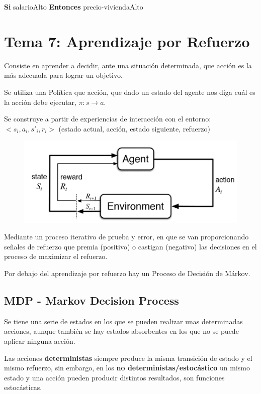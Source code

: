 \documentclass[12pt, twoside, openright]{report} %
\begin{document}
\textbf{Si} salarioAlto \textbf{Entonces} precio-viviendaAlto

\chapter{Tema 7: Aprendizaje por Refuerzo}
Consiste en aprender a decidir, ante una situación determinada, que acción es la más adecuada para lograr un objetivo.

Se utiliza una Política que acción, que dado un estado del agente nos diga cuál es la acción debe ejecutar, $\pi: s \rightarrow a$. 

Se construye a partir de experiencias de interacción con el entorno: $<s_i, a_i, s'_i, r_i>$ (estado actual, acción, estado siguiente, refuerzo)
\begin{figure}[H]
  {\includegraphics[scale=.3]{default.jpg}}
\end{figure}

Mediante un proceso iterativo de prueba y error, en que se van proporcionando señales de refuerzo que premia (positivo) o castigan (negativo) las decisiones en el proceso de maximizar el refuerzo.

Por debajo del aprendizaje por refuerzo hay un Proceso de Decisión de Márkov.

\section{MDP - Markov Decision Process}

Se tiene una serie de estados en los que se pueden realizar unas determinadas acciones, aunque también se hay estados absorbentes en los que no se puede aplicar ninguna acción.

Las acciones \textbf{deterministas} siempre produce la misma transición de estado y el mismo refuerzo, sin embargo, en los \textbf{no deterministas/estocástico} un mismo estado y una acción pueden producir distintos resultados, son funciones estocásticas.
\end{document}
